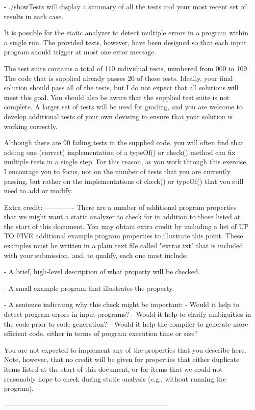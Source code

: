 \documentclass{article}
\begin{document}
- ./showTests  will display a summary of all the tests and your
  most recent set of results in each case.

It is possible for the static analyzer to detect multiple errors in
a program within a single run.  The provided tests, however, have
been designed so that each input program should trigger at most one
error message.

The test suite contains a total of 110 individual tests, numbered
from 000 to 109.  The code that is supplied already passes 20 of
these tests.  Ideally, your final solution should pass all of the
tests, but I do not expect that all solutions will meet this goal.
You should also be aware that the supplied test suite is not
complete.  A larger set of tests will be used for grading, and you
are welcome to develop additional tests of your own devising to
ensure that your solution is working correctly.

Although there are 90 failing tests in the supplied code, you will
often find that adding one (correct) implementation of a typeOf() or
check() method can fix multiple tests in a single step.  For this
reason, as you work through this exercise, I encourage you to focus,
not on the number of tests that you are currently passing, but
rather on the implementations of check() or typeOf() that you still
need to add or modify.

Extra credit:
-------------
There are a number of additional program properties that we might
want a static analyzer to check for in addition to those listed at
the start of this document.  You may obtain extra credit by including
a list of UP TO FIVE additional example program properties to
illustrate this point.  These examples must be written in a plain
text file called "extras.txt" that is included with your submission,
and, to qualify, each one must include:

- A brief, high-level description of what property will be checked.

- A small example program that illustrates the property.

- A sentence indicating why this check might be important:
  - Would it help to detect program errors in input programs?
  - Would it help to clarify ambiguities in the code prior to code
    generation?
  - Would it help the compiler to generate more efficient code,
    either in terms of program execution time or size?

You are not expected to implement any of the properties that you
describe here.  Note, however, that no credit will be given for
properties that either duplicate items listed at the start of this
document, or for items that we could not reasonably hope to check
during static analysis (e.g., without running the program).

------------------------------------------------------------------------
\end{document}

